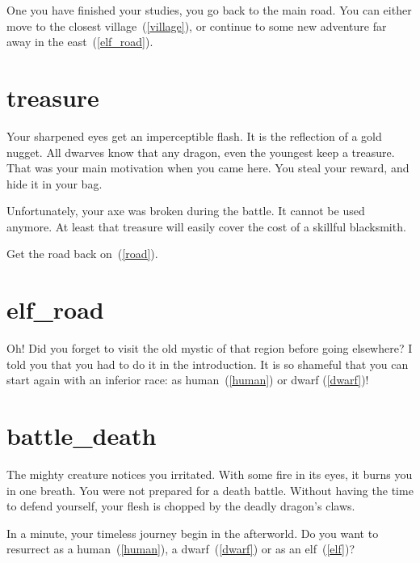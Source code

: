 One you have finished your studies, you go back to the main road. You can either
move to the closest village~(\ref{village}), or continue to some new adventure
far away in the east~(\ref{elf_road}).

\section{treasure}

Your sharpened eyes get an imperceptible flash. It is the reflection of a gold
nugget. All dwarves know that any dragon, even the youngest keep a treasure. That
was your main motivation when you came here. You steal your reward, and hide it
in your bag.

Unfortunately, your axe was broken during the battle. It cannot be used anymore.
At least that treasure will easily cover the cost of a skillful blacksmith.

Get the road back on~(\ref{road}).


\section{elf_road}

Oh! Did you forget to visit the old mystic of that region before going
elsewhere? I told you that you had to do it in the introduction. It is so
shameful that you can start again with an inferior race: as human~(\ref{human})
or dwarf (\ref{dwarf})!

\section{battle_death}

The mighty creature notices you irritated. With some fire in its eyes, it burns
you in one breath. You were not prepared for a death battle. Without having the
time to defend yourself, your flesh is chopped by the deadly dragon's claws.

\medbreak

In a minute, your timeless journey begin in the afterworld. Do you want to resurrect
as a human~(\ref{human}), a dwarf~(\ref{dwarf}) or as an elf~(\ref{elf})?
